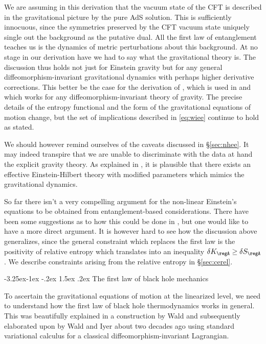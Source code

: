 \documentclass[12pt,openany]{book}
\makeatletter
\renewcommand\subsection{\@startsection{subsection}{2}{\z@}%
                                     {-3.25ex\@plus -1ex \@minus -.2ex}%
                                     {1.5ex \@plus .2ex}%
                                     {\normalfont\bfseries}}
\makeatother
\begin{document}
We are assuming in this derivation that the vacuum state of the CFT is described in the gravitational picture by the pure AdS solution.  This is sufficiently innocuous,  since the symmetries preserved by the CFT vacuum state uniquely single out the  background as the putative dual. All the first law of entanglement teaches us is the dynamics of metric perturbations about this background. At no stage in our derivation have we had to say what the gravitational theory is. The discussion thus holds not just for Einstein gravity but for any general diffeomorphism-invariant gravitational dynamics with perhaps higher derivative corrections. This better be the case for the derivation of \cite{Iyer:1994ys}, which is used in \cite{Faulkner:2013ica}  and which works for any diffeomorphism-invariant theory of gravity. The precise details of the entropy functional and the form of the gravitational equations of motion change, but the set of implications described in \eqref{eq:wiee} continue to hold as stated.

We should however remind ourselves of the caveats discussed in \S\ref{sec:nhee}. It may indeed transpire that we are unable to discriminate with the data at hand the explicit gravity theory. As explained in \cite{Faulkner:2014jva,Haehl:2015rza}, it is plausible that there exists an effective Einstein-Hilbert theory with modified parameters which mimics the gravitational dynamics.

So far there isn't a very compelling argument for the non-linear Einstein's equations to be obtained from entanglement-based considerations. There have been some suggestions as to how this could be done in \cite{Swingle:2014uza}, but one would like to have a more direct argument. It is however hard to see how the discussion above generalizes, since the general constraint which replaces the first law is the positivity of relative entropy which translates into an inequality $\delta K_\regA \geq \delta S_\regA$. We describe constraints arising from the relative entropy in \S\ref{sec:cerel}.



\subsection{The first law of black hole mechanics}
\label{sec:waldi}


To ascertain the gravitational equations of motion at the linearized level, we need to understand how the first law of black hole thermodynamics works in general. This was beautifully explained in a construction by Wald \cite{Wald:1993nt}  and subsequently elaborated upon by Wald and Iyer \cite{Iyer:1994ys} about two decades ago using standard variational calculus for a classical diffeomorphism-invariant Lagrangian.
\end{document}
